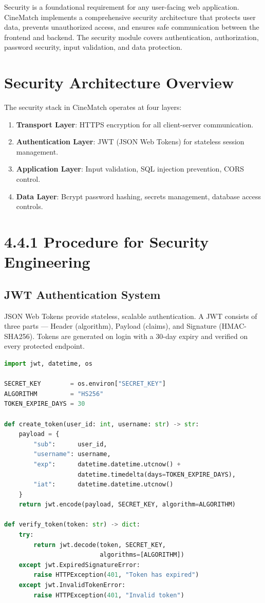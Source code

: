 \documentclass[12pt,a4paper]{report}
\begin{document}
Security is a foundational requirement for any user-facing web application. CineMatch implements a comprehensive security architecture that protects user data, prevents unauthorized access, and ensures safe communication between the frontend and backend. The security module covers authentication, authorization, password security, input validation, and data protection.

\section{Security Architecture Overview}

The security stack in CineMatch operates at four layers:

\begin{enumerate}
    \item \textbf{Transport Layer}: HTTPS encryption for all client-server communication.
    \item \textbf{Authentication Layer}: JWT (JSON Web Tokens) for stateless session management.
    \item \textbf{Application Layer}: Input validation, SQL injection prevention, CORS control.
    \item \textbf{Data Layer}: Bcrypt password hashing, secrets management, database access controls.
\end{enumerate}

\section{4.4.1 Procedure for Security Engineering}

\subsection{JWT Authentication System}

JSON Web Tokens provide stateless, scalable authentication. A JWT consists of three parts — Header (algorithm), Payload (claims), and Signature (HMAC-SHA256). Tokens are generated on login with a 30-day expiry and verified on every protected endpoint.

\begin{lstlisting}[language=Python, caption={JWT Token Generation and Verification}]
import jwt, datetime, os

SECRET_KEY        = os.environ["SECRET_KEY"]
ALGORITHM         = "HS256"
TOKEN_EXPIRE_DAYS = 30

def create_token(user_id: int, username: str) -> str:
    payload = {
        "sub":      user_id,
        "username": username,
        "exp":      datetime.datetime.utcnow() +
                    datetime.timedelta(days=TOKEN_EXPIRE_DAYS),
        "iat":      datetime.datetime.utcnow()
    }
    return jwt.encode(payload, SECRET_KEY, algorithm=ALGORITHM)

def verify_token(token: str) -> dict:
    try:
        return jwt.decode(token, SECRET_KEY,
                          algorithms=[ALGORITHM])
    except jwt.ExpiredSignatureError:
        raise HTTPException(401, "Token has expired")
    except jwt.InvalidTokenError:
        raise HTTPException(401, "Invalid token")
\end{lstlisting}
\end{document}
